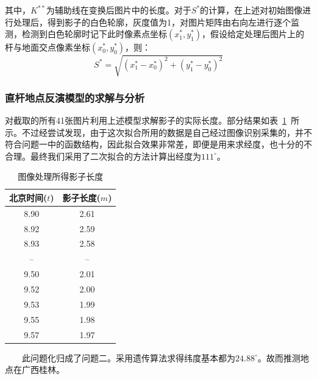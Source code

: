\documentclass[12pt]{cumcmart}   %
\begin{document}
其中，$K^{**}$为辅助线在变换后图片中的长度。对于$S^{*}$的计算，在上述对初始图像进行处理后，得到影子的白色轮廓，灰度值为1，对图片矩阵由右向左进行逐个监测，检测到白色轮廓时记下此时像素点坐标$(x_1^*,y_1^*)$，假设给定处理后图片上的杆与地面交点像素坐标$(x_0^*,y_0^*)$，则：
\begin{equation}
{S^*} = \sqrt {{{(x_1^* - x_0^*)}^2} + {{(y_1^* - y_0^*)}^2}} 
\end{equation}
\subsubsection{直杆地点反演模型的求解与分析}
对截取的所有41张图片利用上述模型求解影子的实际长度。部分结果如表~\ref{baogao4}~所示。不过经尝试发现，由于这次拟合所用的数据是自己经过图像识别采集的，并不符合问题一中的函数结构，因此拟合效果非常差，即便是用来求经度，也十分的不合理。最终我们采用了二次拟合的方法计算出经度为$111^\circ$。
\begin{table}[!htbp]
	\centering
	\caption{图像处理所得影子长度}\label{baogao4}
	\begin{tabular}{cc}
		\toprule[1.5pt]
		北京时间($t$)& 影子长度($m$) \\
		\midrule[1pt]
		8.90 &	2.61 \\
		8.92 &	2.59 \\
		8.93 &	2.58 \\
		-- &	-- \\
		9.50 &	2.01 \\
		9.52 &	2.00 \\
		9.53 &	1.99 \\
		9.55 &	1.98 \\
		9.57 &	1.97 \\
		\bottomrule[1.5pt]
	\end{tabular}
\end{table}
$\qquad$此问题化归成了问题二。采用遗传算法求得纬度基本都为$24.88^\circ$。故而推测地点在广西桂林。
\end{document}
